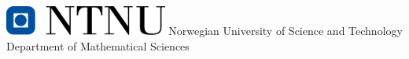 \begin{titlepage}
    \vfill
    
    \begin{center}
        \includegraphics[width=0.4\textwidth]{figures/ntnu_hovedlogo_bred.png}
        {\color{ntnu-blue}\sffamily\Large Norwegian University of Science and Technology}\\
        \vspace{0.3cm}
        {\sffamily\large Department of Mathematical Sciences}
    \end{center}
    
    \vspace{1cm}
\end{titlepage}



